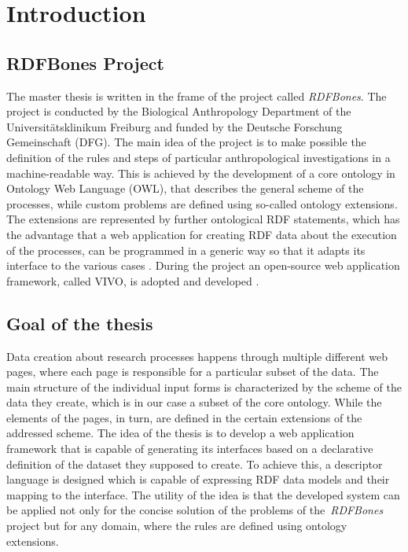 \chapter{Introduction}


\section{RDFBones Project}

The master thesis is written in the frame of the project called \textit{RDFBones}. The project is conducted by the Biological Anthropology Department of the Universitätsklinikum Freiburg and funded by the Deutsche Forschung Gemeinschaft (DFG). The main idea of the project is to make possible the definition of the rules and steps of particular anthropological investigations in a machine-readable way. This is achieved by the development of a core ontology in Ontology Web Language (OWL), that describes the general scheme of the processes, while custom problems are defined using so-called ontology extensions. The extensions are represented by further ontological RDF statements, which has the advantage that a web application for creating RDF data about the execution of the processes, can be programmed in a generic way so that it adapts its interface to the various cases \cite{infrastructure}. During the project an open-source web application framework, called VIVO, is adopted and developed \cite{DBLP:series/synthesis/2012Borner}.

\section{Goal of the thesis}

Data creation about research processes happens through multiple different web pages, where each page is responsible for a particular subset of the data. The main structure of the individual input forms is characterized by the scheme of the data they create, which is in our case a subset of the core ontology. While the elements of the pages, in turn, are defined in the certain extensions of the addressed scheme. The idea of the thesis is to develop a web application framework that is capable of generating its interfaces based on a declarative definition of the dataset they supposed to create. To achieve this, a descriptor language is designed which is capable of expressing RDF data models and their mapping to the interface. The utility of the idea is that the developed system can be applied not only for the concise solution of the problems of the \textit{RDFBones} project but for any domain, where the rules are defined using ontology extensions.

